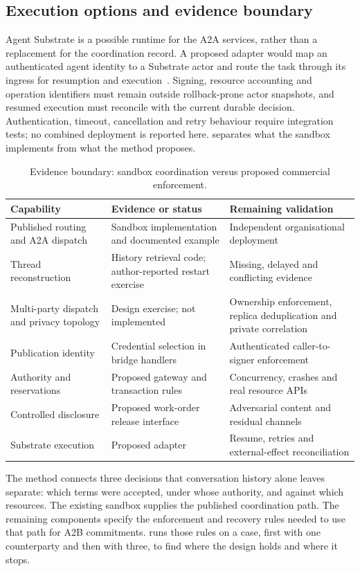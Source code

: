 \subsection{Execution options and evidence boundary}

Agent Substrate is a possible runtime for the A2A services, rather than a replacement for the coordination record. A proposed adapter would map an authenticated agent identity to a Substrate actor and route the task through its ingress for resumption and execution~\citep{substrateoverview,substratearchitecture}. Signing, resource accounting and operation identifiers must remain outside rollback-prone actor snapshots, and resumed execution must reconcile with the current durable decision. Authentication, timeout, cancellation and retry behaviour require integration tests; no combined deployment is reported here.  separates what the sandbox implements from what the method proposes.

\begin{table}[htbp]
\centering\small
\caption{Evidence boundary: sandbox coordination versus proposed commercial enforcement.}
\label{tab:method-status}
\begin{tabularx}{\textwidth}{@{}P{3.2cm}LL@{}}
\toprule
Capability & Evidence or status & Remaining validation \\
\midrule
Published routing and A2A dispatch & Sandbox implementation and documented example & Independent organisational deployment \\
Thread reconstruction & History retrieval code; author-reported restart exercise & Missing, delayed and conflicting evidence \\
Multi-party dispatch and privacy topology & Design exercise; not implemented & Ownership enforcement, replica deduplication and private correlation \\
Publication identity & Credential selection in bridge handlers & Authenticated caller-to-signer enforcement \\
Authority and reservations & Proposed gateway and transaction rules & Concurrency, crashes and real resource APIs \\
Controlled disclosure & Proposed work-order release interface & Adversarial content and residual channels \\
Substrate execution & Proposed adapter & Resume, retries and external-effect reconciliation \\
\bottomrule
\end{tabularx}
\end{table}

The method connects three decisions that conversation history alone leaves separate: which terms were accepted, under whose authority, and against which resources. The existing sandbox supplies the published coordination path. The remaining components specify the enforcement and recovery rules needed to use that path for A2B commitments.  runs those rules on a case, first with one counterparty and then with three, to find where the design holds and where it stops.
